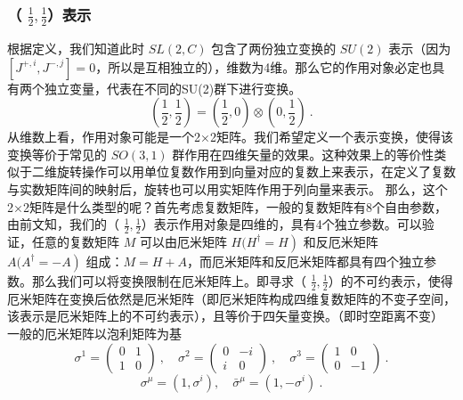 \subsubsection{（ $\frac{1}{2},\frac{1}{2}$）表示}
根据定义，我们知道此时 $SL(2,C)$ 包含了两份独立变换的 $SU(2)$ 表示（因为 $[J^{+, i}, J^{-, j}]=0$，所以是互相独立的），维数为4维。那么它的作用对象必定也具有两个独立变量，代表在不同的SU(2)群下进行变换。
\begin{equation}
\left(\frac{1}{2}, \frac{1}{2}\right)=\left(\frac{1}{2}, 0\right) \otimes\left(0, \frac{1}{2}\right)~.
\end{equation}
从维数上看，作用对象可能是一个2×2矩阵。我们希望定义一个表示变换，使得该变换等价于常见的 $SO(3,1)$ 群作用在四维矢量的效果。这种效果上的等价性类似于二维旋转操作可以用单位复数作用到向量对应的复数上来表示，在定义了复数与实数矩阵间的映射后，旋转也可以用实矩阵作用于列向量来表示。
那么，这个2×2矩阵是什么类型的呢？首先考虑复数矩阵，一般的复数矩阵有8个自由参数，由前文知，我们的（ $\frac{1}{2},\frac{1}{2}$）表示作用对象是四维的，具有4个独立参数。可以验证，任意的复数矩阵 $M$ 可以由厄米矩阵 $H(\left.H^{\dagger}=H\right)$ 和反厄米矩阵 $A(\left.A^{\dagger}=-A\right)$ 组成：$M=H+A$，而厄米矩阵和反厄米矩阵都具有四个独立参数。那么我们可以将变换限制在厄米矩阵上。即寻求（ $\frac{1}{2},\frac{1}{2}$）的不可约表示，使得厄米矩阵在变换后依然是厄米矩阵（即厄米矩阵构成四维复数矩阵的不变子空间，该表示是厄米矩阵上的不可约表示），且等价于四矢量变换。（即时空距离不变）
一般的厄米矩阵以泡利矩阵为基
\begin{equation}
\sigma^{1}=\left(\begin{array}{ll}
0 & 1 \\
1 & 0
\end{array}\right)~, \quad \sigma^{2}=\left(\begin{array}{cc}
0 & -i \\
i & 0
\end{array}\right)~, \quad \sigma^{3}=\left(\begin{array}{cc}
1 & 0 \\
0 & -1
\end{array}\right)~.
\end{equation}
\begin{equation}
\sigma^{\mu}=\left(1, \sigma^{i}\right), \quad \bar{\sigma}^{\mu}=\left(1,-\sigma^{i}\right)~.
\end{equation}
